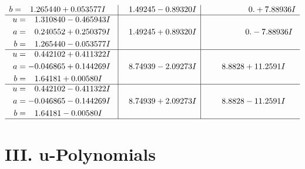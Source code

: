 \documentclass[1p]{elsarticle_modified}
\theoremstyle{definition}
\begin{document}
$$\begin{array}{c|c|c}
\begin{aligned}
b &= \phantom{-}1.265440 + 0.053577 I\end{aligned}
 & \phantom{-}1.49245 - 0.89320 I & \phantom{-0.000000 -}0. + 7.88936 I \\ \hline\begin{aligned}
u &= \phantom{-}1.310840 - 0.465943 I \\
a &= \phantom{-}0.240552 + 0.250379 I \\
b &= \phantom{-}1.265440 - 0.053577 I\end{aligned}
 & \phantom{-}1.49245 + 0.89320 I & \phantom{-0.000000 } 0. - 7.88936 I \\ \hline\begin{aligned}
u &= \phantom{-}0.442102 + 0.411322 I \\
a &= -0.046865 + 0.144269 I \\
b &= \phantom{-}1.64181 + 0.00580 I\end{aligned}
 & \phantom{-}8.74939 - 2.09273 I & \phantom{-}8.8828 + 11.2591 I \\ \hline\begin{aligned}
u &= \phantom{-}0.442102 - 0.411322 I \\
a &= -0.046865 - 0.144269 I \\
b &= \phantom{-}1.64181 - 0.00580 I\end{aligned}
 & \phantom{-}8.74939 + 2.09273 I & \phantom{-}8.8828 - 11.2591 I\\
 \hline 
 \end{array}$$\newpage
\newpage\renewcommand{\arraystretch}{1}
\centering \section*{ III. u-Polynomials}
\end{document}
